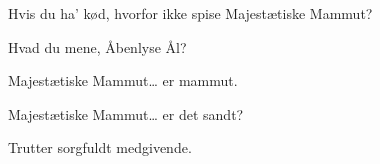 \documentclass[a4paper,11pt]{article}
\begin{document}
\begin{sketch}
 Hvis du ha’ kød, hvorfor ikke spise Majestætiske Mammut?


 Hvad du mene, Åbenlyse Ål?

 Majestætiske Mammut… er mammut. 

 Majestætiske Mammut… er det sandt?

 Trutter sorgfuldt medgivende. 




\end{sketch}
\end{document}
